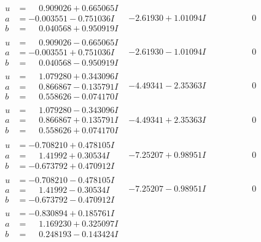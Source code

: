 \documentclass[1p]{elsarticle_modified}
\theoremstyle{definition}
\begin{document}
$$\begin{array}{c|c|c}
\begin{aligned}
u &= \phantom{-}0.909026 + 0.665065 I \\
a &= -0.003551 - 0.751036 I \\
b &= \phantom{-}0.040568 + 0.950919 I\end{aligned}
 & -2.61930 + 1.01094 I & \phantom{-0.000000 } 0 \\ \hline\begin{aligned}
u &= \phantom{-}0.909026 - 0.665065 I \\
a &= -0.003551 + 0.751036 I \\
b &= \phantom{-}0.040568 - 0.950919 I\end{aligned}
 & -2.61930 - 1.01094 I & \phantom{-0.000000 } 0 \\ \hline\begin{aligned}
u &= \phantom{-}1.079280 + 0.343096 I \\
a &= \phantom{-}0.866867 - 0.135791 I \\
b &= \phantom{-}0.558626 - 0.074170 I\end{aligned}
 & -4.49341 - 2.35363 I & \phantom{-0.000000 } 0 \\ \hline\begin{aligned}
u &= \phantom{-}1.079280 - 0.343096 I \\
a &= \phantom{-}0.866867 + 0.135791 I \\
b &= \phantom{-}0.558626 + 0.074170 I\end{aligned}
 & -4.49341 + 2.35363 I & \phantom{-0.000000 } 0 \\ \hline\begin{aligned}
u &= -0.708210 + 0.478105 I \\
a &= \phantom{-}1.41992 + 0.30534 I \\
b &= -0.673792 + 0.470912 I\end{aligned}
 & -7.25207 + 0.98951 I & \phantom{-0.000000 } 0 \\ \hline\begin{aligned}
u &= -0.708210 - 0.478105 I \\
a &= \phantom{-}1.41992 - 0.30534 I \\
b &= -0.673792 - 0.470912 I\end{aligned}
 & -7.25207 - 0.98951 I & \phantom{-0.000000 } 0 \\ \hline\begin{aligned}
u &= -0.830894 + 0.185761 I \\
a &= \phantom{-}1.169230 + 0.325097 I \\
b &= \phantom{-}0.248193 - 0.143424 I\end{aligned}

\end{array}$$
\end{document}
